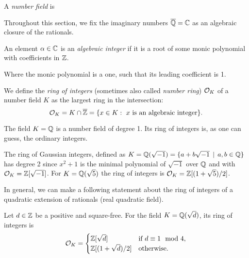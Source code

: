 \begin{definition}
    A \textit{number field} is
\end{definition}

Throughout this section, we fix the imaginary numbers $\overline{\mathbb{Q}} = \mathbb{C}$ as an algebraic closure of the rationals.


\begin{definition}
    An element $\alpha \in \mathbb{C}$ is an \textit{algebraic integer} if it is a root of some monic polynomial with coefficients in $\mathbb{Z}$.
\end{definition}
Where the monic polynomial is a one, such that its leading coefficient is 1.

\begin{definition}
We define the \textit{ring of integers} (sometimes also called \textit{number ring}) $\mathcal{O}_K$ of a number field $K$ as the largest ring in the intersection:
$$
  \mathcal{O}_K = K \cap \overline{\mathbb{Z}} = \{x \in K : \text{ $x$ is an algebraic integer}\}.
$$
\end{definition}

\begin{example}
    The field $K = \mathbb{Q}$ is a number field of degree 1. Its ring of integers is, as one can guess, the ordinary integers.
\end{example}

\begin{example}
    The ring of Gaussian integers, defined as $K = \mathbb{Q}(\sqrt{-1}) = \{a + b\sqrt{-1}\, \mid\, a,b\in \mathbb{Q}\}$
    has degree 2 since $x^2+1$ is the minimal polynomial of $\sqrt{-1}$ over $\mathbb{Q}$ and with $\mathcal{O}_K = \mathbb{Z}[\sqrt{-1}]$. For $K = \mathbb{Q}(\sqrt{5})$ the ring of integers is $\mathcal{O}_K = \mathbb{Z}[(1 + \sqrt{5})/2]$. 
\end{example}

In general, we can make a following statement about the ring of integers of a quadratic extension of rationals (real quadratic field).
\begin{theorem}
     Let $d \in \mathbb{Z}$ be a positive and square-free. For the field $K = \mathbb{Q}(\sqrt{d})$, its ring of integers is 
     \[ \mathcal{O}_K = 
	 \begin{cases} 
	     \mathbb{Z}[\sqrt{d}] & \text{if $d \equiv 1 \mod 4$}, \\
	     \mathbb{Z}[(1 + \sqrt{d})/2] & \text{otherwise}.
     	 \end{cases}
     \]
\end{theorem}

